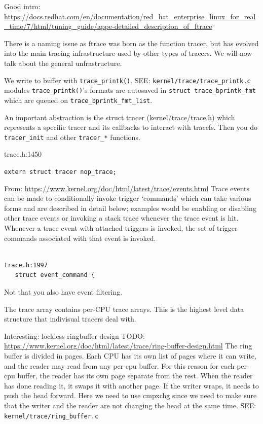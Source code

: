 Good intro:
\url{https://docs.redhat.com/en/documentation/red_hat_enterprise_linux_for_real_time/7/html/tuning_guide/appe-detailed_description_of_ftrace}

There is a naming issue as ftrace was born as the function tracer, but has
evolved into the main tracing infrastructure used by other types of tracers. We
will now talk about the general unfrastructure.

We write to buffer with \verb|trace_printk()|.  SEE:
\verb|kernel/trace/trace_printk.c| modules \verb|trace_printk()|'s formats are
autosaved in \verb|struct trace_bprintk_fmt| which are queued on
\verb|trace_bprintk_fmt_list|.

An important abstraction is the struct tracer (kernel/trace/trace.h) which
represents a specific tracer and its callbacks to interact with tracefs. Then
you do \verb|tracer_init| and other \verb|tracer_*| functions.

trace.h:1450

   \verb|extern struct tracer nop_trace;|

From: \url{https://www.kernel.org/doc/html/latest/trace/events.html} Trace
events can be made to conditionally invoke trigger ‘commands’ which can take
various forms and are described in detail below; examples would be enabling or
disabling other trace events or invoking a stack trace whenever the trace event
is hit. Whenever a trace event with attached triggers is invoked, the set of
trigger commands associated with that event is invoked.

\begin{verbatim}

trace.h:1997
   struct event_command {

\end{verbatim}

Not that you also have event filtering.

The trace array contains per-CPU trace arrays. This is the highest level data
structure that indivisual tracers deal with.

Interesting: lockless ringbuffer design TODO:
\url{https://www.kernel.org/doc/html/latest/trace/ring-buffer-design.html} The
ring buffer is divided in pages. Each CPU has its own list of pages where it can
write, and the reader may read from any per-cpu buffer. For this reason for each
per-cpu buffer, the reader has its own page separate from the rest. When the
reader has done reading it, it swaps it with another page. If the writer wraps,
it needs to push the head forward. Here we need to use cmpxchg since we need to
make sure that the writer and the reader are not changing the head at the same
time.  SEE: \verb|kernel/trace/ring_buffer.c|

